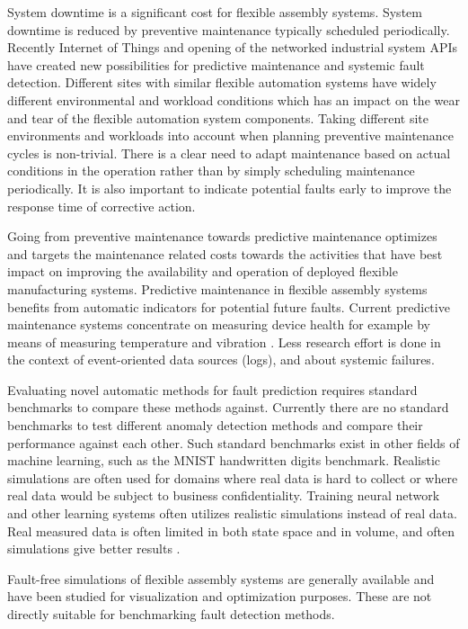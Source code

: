 \documentclass[journal]{IEEEtran}
\begin{document}
System downtime is a significant cost for flexible assembly systems. System downtime is reduced by preventive maintenance typically scheduled periodically.
Recently Internet of Things and opening of the networked industrial system APIs have created new possibilities for predictive maintenance and systemic fault detection. Different sites with similar
flexible automation systems have widely different environmental and workload conditions which has an impact on the wear and tear of the flexible automation system components.
Taking different site environments and workloads into account when planning preventive maintenance cycles is non-trivial. There is a clear need to adapt maintenance based on actual
conditions in the operation rather than by simply scheduling maintenance periodically. It is also important to indicate potential faults early to improve the response time of corrective action.

Going from preventive maintenance towards predictive maintenance optimizes and targets the maintenance related costs towards the activities that have best impact
on improving the availability and operation of deployed flexible manufacturing systems.
Predictive maintenance in flexible assembly systems benefits from automatic indicators for potential future faults.
Current predictive maintenance systems concentrate on measuring device health for example by means of measuring temperature and vibration
\cite{contreras2002integrating}. Less research effort is done in the context of event-oriented data sources (logs), and about systemic failures.

Evaluating novel automatic methods for fault prediction requires standard benchmarks to compare these methods against. Currently there are no standard benchmarks to test
different anomaly detection methods and compare their performance against each other. Such standard benchmarks exist in other fields of machine learning,
such as the MNIST handwritten digits benchmark\cite{lecun-mnisthandwrittendigit-2010}. Realistic simulations are often used\cite{jager2014assessing} for domains where
real data is hard to collect or where real data would be subject to business confidentiality. Training neural network and other learning systems often utilizes realistic
simulations instead of real data. Real measured data is often limited in both state space and in volume, and often simulations give better results \cite{duch2005artificial}.

Fault-free simulations of flexible assembly systems are generally available\cite{giulio} and have been studied for visualization and optimization purposes.
These are not directly suitable for benchmarking fault detection methods.
\end{document}
